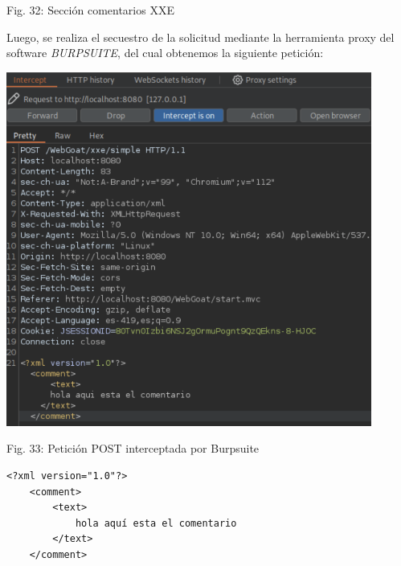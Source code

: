 \documentclass[12pt,oneside,a4paper]{book}
\begin{document}
\begin{enumerate}
\begin{enumerate}
\begin{center}
            \vspace{0.1em}
            
            Fig. 32: Sección comentarios XXE
        \end{center}
        
        \vspace{2em}

        \hspace{20pt}
        Luego, se realiza el secuestro de la solicitud mediante la herramienta proxy del software \textit{BURPSUITE}, del cual obtenemos la siguiente petición:

        \newpage

        \begin{center}
            \includegraphics[width=12cm]{img/xxe1.png}
            
            \vspace{0.1em}
            
            Fig. 33: Petición POST interceptada por Burpsuite
        \end{center}
        
        \vspace{2em}

        \begin{verbatim}
<?xml version="1.0"?>
    <comment>
        <text>
            hola aquí esta el comentario
        </text>
    </comment>
        \end{verbatim}


\end{enumerate}
\end{enumerate}
\end{document}

